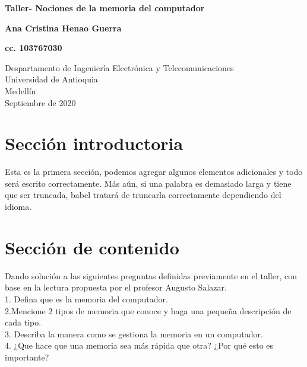 \documentclass{article}
\begin{document}
\begin{titlepage}
    \begin{center}
        \vspace*{1cm}
            
        \Huge
        \textbf{Taller- Nociones de la memoria del computador}
            
        \vspace{0.5cm}
        \LARGE
        
            
        \vspace{1.5cm}
            
        \textbf{Ana Cristina Henao Guerra}
        
        \textbf{cc. 103767030}
            
        \vfill
            
        \vspace{0.8cm}
            
        \Large
        Despartamento de Ingeniería Electrónica y Telecomunicaciones\\
        Universidad de Antioquia\\
        Medellín\\
        Septiembre de 2020
            
    \end{center}
\end{titlepage}

\tableofcontents
\newpage
\section{Sección introductoria}\label{intro}
Esta es la primera sección, podemos agregar algunos elementos adicionales y todo será escrito correctamente. Más aún, si una palabra es demasiado larga y tiene que ser truncada, babel tratará de truncarla correctamente dependiendo del idioma.

\section{Sección de contenido} \label{contenido}
Dando solución a las siguientes preguntas definidas previamente en el taller, con base en la lectura propuesta por el profesor Augusto Salazar.\\
%
1. Defina que es la memoria del computador.\\
2.Mencione 2 tipos de memoria que conoce y haga una pequeña descripción de cada tipo.\\
3. Describa la manera como se gestiona la memoria en un computador.\\
4. ¿Que hace que una memoria sea más rápida que otra? ¿Por qué esto es importante?
\end{document}

